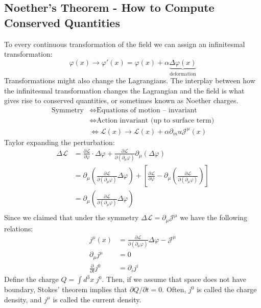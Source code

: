 \documentclass{report}
\theoremstyle{plain}
\theoremstyle{definition}
\theoremstyle{remark}
\newcommand{\FR}[2]{\frac{#1}{#2}}
\newcommand{\mc}{\mathcal}
\newcommand{\vphi}{\varphi}
\newcommand{\di}{\partial}
\newcommand{\ddi}[2]{\FR{\partial {#1}}{\partial {#2}}}
\begin{document}
\subsection{Noether's Theorem - How to Compute Conserved Quantities}
To every continuous transformation of the field we can assign an infinitesmal
transformation:
\[ \vphi(x) \rightarrow \vphi'(x) = \vphi(x) +
\alpha\underbrace{\Delta\vphi(x)}_{\text{deformation}}\]
Transformations might also change the Lagrangians. The interplay between
how the infinitesmal transformation changes the Lagrangian and the field is
what gives rise to conserved quantities, or sometimes known as Noether charges.
\begin{align*}
    \text{Symmetry} &\iff \text{Equations of motion -- invariant}\\
    &\iff \text{Action invariant (up to surface term)}\\
    &\iff \mc L(x) \rightarrow \mc L(x) + \alpha\di_mu \mc J^\mu(x)
\end{align*}
Taylor expanding the perturbation:
\begin{align*}
    \Delta \mc L &= \ddi{\mc L}{\vphi} \cdot \Delta \vphi + \ddi{\mc
    L}{(\di_\mu\vphi)}\di_\mu(\Delta\vphi)\\
    &= \di_\mu\left( \ddi{\mc L}{(\di_\mu\vphi)}\Delta\vphi \right) +
    \left[ \ddi{\mc L}{\vphi} - \di_\mu \left( \ddi{\mc L}{(\di_\mu \vphi)}
    \right) \right]\\
    &= \di_\mu\left( \ddi{\mc L}{(\di_\mu\vphi)}\Delta\vphi \right)\\
\end{align*}
Since we claimed that under the symmetry $\Delta\mc L = \di_\mu \mc J^\mu$
we have the following relations:
\begin{align*}
    j^\mu(x) &= \ddi{\mc L}{(\di_\mu\vphi)}\Delta\vphi - \mc J^\mu\\
    \di_\mu j^\mu &= 0\\
    \ddi{}{t} j^0 &= \di_i j^i
\end{align*}
Define the charge $Q = \int d^3x\; j^0$. Then, if we assume that space does
not have boundary, Stokes' theorem implies that $\di Q/\di t = 0$. Often,
$j^0$ is called the charge density, and $j^\mu$ is called the current
density.

\end{document}
